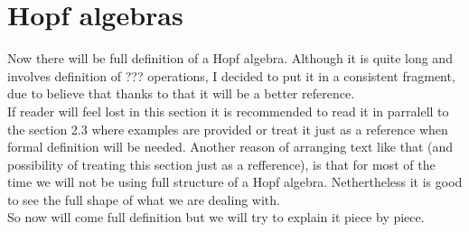 \documentclass[a4paper, 12pt]{report}
\begin{document}
\chapter{Hopf algebras}
%
Now there will be full definition of a Hopf algebra. Although it is quite long and involves
definition of ??? operations, I decided to put it in a consistent fragment, due to believe
that thanks to that it will be a better reference. \\
If reader will feel lost in this section it is recommended to read it in parralell to the section 2.3
where examples are provided or treat it just as a reference  when formal definition will be needed.
Another reason of arranging text like that (and possibility of treating this section just as a refference),
is that for most of the time we will not be using full structure of a Hopf algebra. Nethertheless it is good
to see the full shape of what we are dealing with. \\
So now will come full definition but we will try to explain it piece by piece. \\[8pt]
\end{document}
